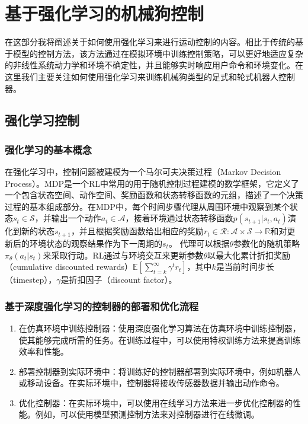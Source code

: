 
\chapter[基于强化学习的机械狗控制]{\label{section:rl_based_control}基于强化学习的机械狗控制}
在这部分我将阐述关于如何使用强化学习来进行运动控制的内容。相比于传统的基于模型的控制方法，该方法通过在模拟环境中训练控制策略，可以更好地适应复杂的非线性系统动力学和环境不确定性，并且能够实时响应用户命令和环境变化。在这里我们主要关注如何使用强化学习来训练机械狗类型的足式和轮式机器人控制器。

\section[强化学习控制]{强化学习控制}

\subsection[强化学习的基本概念]{强化学习的基本概念\cite{Lee_Bjelonic_Hutter_2023}}

在强化学习中，控制问题被建模为一个马尔可夫决策过程（Markov Decision Process）。MDP是一个RL中常用的用于随机控制过程建模的数学框架，它定义了一个包含状态空间、动作空间、奖励函数和状态转移函数的元组，描述了一个决策过程的基本组成部分。在MDP中，每个时间步骤代理从周围环境中观察到某个状态$s_t \in \mathcal{S}$，并输出一个动作$a_t \in \mathcal{A}$，接着环境通过状态转移函数$p(s_{t+1}|s_t, a_t)$演化到新的状态$s_{t+1}$，并且根据奖励函数给出相应的奖励$r_t\in \mathcal{R}:\mathcal{A}\times\mathcal{S}\to \mathbb{R}$和对更新后的环境状态的观察结果作为下一周期的$s_t$。
代理可以根据$\theta$参数化的随机策略$\pi_\theta(a_t|s_t)$来采取行动。RL通过与环境交互来更新参数$\theta$以最大化累计折扣奖励（cumulative discounted rewards）$\mathbb{E} [\sum_{t=k}^{\infty}\gamma^t r_t]$，其中$k$是当前时间步长（timestep），$\gamma$是折扣因子（discount factor）。

\subsection[基于深度强化学习的控制器的部署和优化流程]{基于深度强化学习的控制器的部署和优化流程}

\begin{enumerate}
    \item 在仿真环境中训练控制器：使用深度强化学习算法在仿真环境中训练控制器，使其能够完成所需的任务。在训练过程中，可以使用特权训练方法来提高训练效率和性能。
    \item 部署控制器到实际环境中：将训练好的控制器部署到实际环境中，例如机器人或移动设备。在实际环境中，控制器将接收传感器数据并输出动作命令。
    \item 优化控制器：在实际环境中，可以使用在线学习方法来进一步优化控制器的性能。例如，可以使用模型预测控制方法来对控制器进行在线微调。
\end{enumerate}

